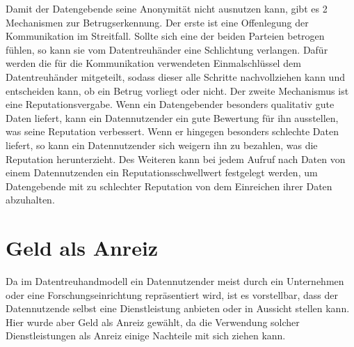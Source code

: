 \documentclass[
	fontsize=12pt,
	headings=small,
	parskip=half,           %
	bibliography=totoc,
	numbers=noenddot,       %
	open=any,               %
]{scrreprt}
\begin{document}
Damit der Datengebende seine Anonymität nicht ausnutzen kann, gibt es 2 Mechanismen zur Betrugserkennung. Der erste ist eine Offenlegung der Kommunikation im Streitfall. Sollte sich eine der beiden Parteien betrogen fühlen, so kann sie vom Datentreuhänder eine Schlichtung verlangen. Dafür werden die für die Kommunikation verwendeten Einmalschlüssel dem Datentreuhänder mitgeteilt, sodass dieser alle Schritte nachvollziehen kann und entscheiden kann, ob ein Betrug vorliegt oder nicht. 
Der zweite Mechanismus ist eine Reputationsvergabe. Wenn ein Datengebender besonders qualitativ gute Daten liefert, kann ein Datennutzender ein gute Bewertung für ihn ausstellen, was seine Reputation verbessert. Wenn er hingegen besonders schlechte Daten liefert, so kann ein Datennutzender sich weigern ihn zu bezahlen, was die Reputation herunterzieht. Des Weiteren kann bei jedem Aufruf nach Daten von einem Datennutzenden ein Reputationsschwellwert festgelegt werden, um Datengebende mit zu schlechter Reputation von dem Einreichen ihrer Daten abzuhalten. 

\section{Geld als Anreiz}
Da im Datentreuhandmodell ein Datennutzender meist durch ein Unternehmen oder eine Forschungseinrichtung repräsentiert wird, ist es vorstellbar, dass der Datennutzende selbst eine Dienstleistung anbieten oder in Aussicht stellen kann. Hier wurde aber Geld als Anreiz gewählt, da die Verwendung solcher Dienstleistungen als Anreiz einige Nachteile mit sich ziehen kann.
\end{document}
